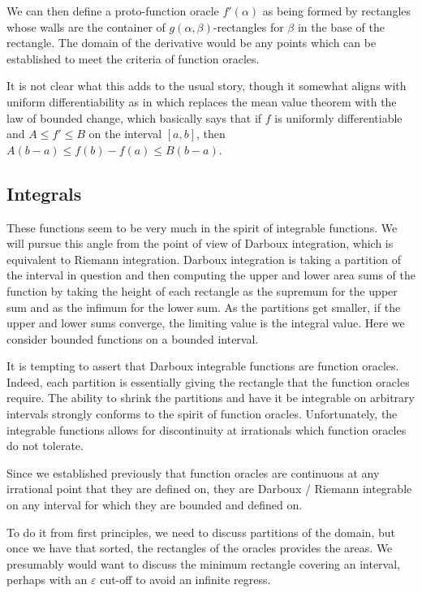 \documentclass[12pt]{article}
\begin{document}
We can then define a proto-function oracle $f'(\alpha)$ as being formed by rectangles whose walls are the container of $g(\alpha, \beta)$-rectangles for $\beta$ in the base of the rectangle. The domain of the derivative would be any points which can be established to meet the criteria of function oracles. 

It is not clear what this adds to the usual story, though it somewhat aligns with uniform differentiability as in \cite{BriStol} which replaces the mean value theorem with the law of bounded change, which basically says that if $f$ is uniformly differentiable and $A \leq f' \leq B$ on the interval $[a,b]$, then $A(b-a) \leq f(b)-f(a) \leq B(b-a)$.  

\subsection{Integrals}\label{sec:int}

These functions seem to be very much in the spirit of integrable functions. We will pursue this angle from the point of view of Darboux integration, which is equivalent to Riemann integration. Darboux integration is taking a partition of the interval in question and then computing the upper and lower area sums of the function by taking the height of each rectangle as the supremum for the upper sum and as the infimum for the lower sum. As the partitions get smaller, if the upper and lower sums converge, the limiting value is the integral value. Here we consider bounded functions on a bounded interval. 

It is tempting to assert that Darboux integrable functions are function oracles. Indeed, each partition is essentially giving the rectangle that the function oracles require. The ability to shrink the partitions and have it be integrable on arbitrary intervals strongly conforms to the spirit of function oracles. Unfortunately, the integrable functions allows for discontinuity at irrationals which function oracles do not tolerate. 

Since we established previously that function oracles are continuous at any irrational point that they are defined on, they are Darboux / Riemann integrable on any interval for which they are bounded and defined on. 

To do it from first principles, we need to discuss partitions of the domain, but once we have that sorted, the rectangles of the oracles provides the areas. We presumably would want to discuss the minimum rectangle covering an interval, perhaps with an $\varepsilon$ cut-off to avoid an infinite regress. 
\end{document}
